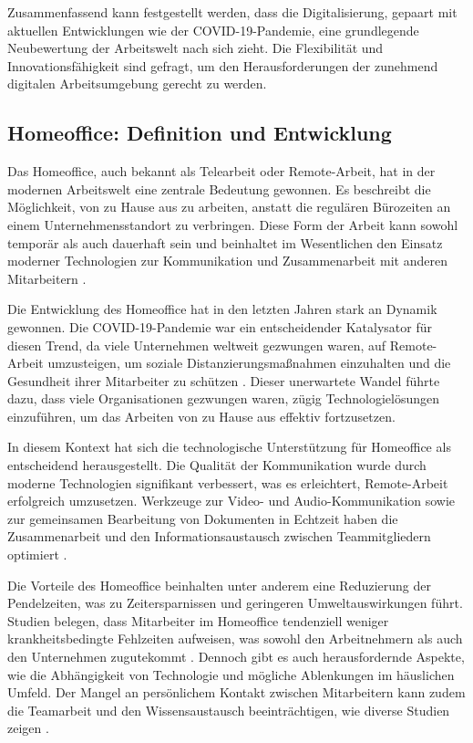 Zusammenfassend kann festgestellt werden, dass die Digitalisierung, gepaart mit aktuellen Entwicklungen wie der COVID-19-Pandemie, eine grundlegende Neubewertung der Arbeitswelt nach sich zieht. Die Flexibilität und Innovationsfähigkeit sind gefragt, um den Herausforderungen der zunehmend digitalen Arbeitsumgebung gerecht zu werden.

\subsection{Homeoffice: Definition und Entwicklung}

Das Homeoffice, auch bekannt als Telearbeit oder Remote-Arbeit, hat in der modernen Arbeitswelt eine zentrale Bedeutung gewonnen. Es beschreibt die Möglichkeit, von zu Hause aus zu arbeiten, anstatt die regulären Bürozeiten an einem Unternehmensstandort zu verbringen. Diese Form der Arbeit kann sowohl temporär als auch dauerhaft sein und beinhaltet im Wesentlichen den Einsatz moderner Technologien zur Kommunikation und Zusammenarbeit mit anderen Mitarbeitern \cite{7}.

Die Entwicklung des Homeoffice hat in den letzten Jahren stark an Dynamik gewonnen. Die COVID-19-Pandemie war ein entscheidender Katalysator für diesen Trend, da viele Unternehmen weltweit gezwungen waren, auf Remote-Arbeit umzusteigen, um soziale Distanzierungsmaßnahmen einzuhalten und die Gesundheit ihrer Mitarbeiter zu schützen \cite{file1}. Dieser unerwartete Wandel führte dazu, dass viele Organisationen gezwungen waren, zügig Technologielösungen einzuführen, um das Arbeiten von zu Hause aus effektiv fortzusetzen.

In diesem Kontext hat sich die technologische Unterstützung für Homeoffice als entscheidend herausgestellt. Die Qualität der Kommunikation wurde durch moderne Technologien signifikant verbessert, was es erleichtert, Remote-Arbeit erfolgreich umzusetzen. Werkzeuge zur Video- und Audio-Kommunikation sowie zur gemeinsamen Bearbeitung von Dokumenten in Echtzeit haben die Zusammenarbeit und den Informationsaustausch zwischen Teammitgliedern optimiert \cite{7}.

Die Vorteile des Homeoffice beinhalten unter anderem eine Reduzierung der Pendelzeiten, was zu Zeitersparnissen und geringeren Umweltauswirkungen führt. Studien belegen, dass Mitarbeiter im Homeoffice tendenziell weniger krankheitsbedingte Fehlzeiten aufweisen, was sowohl den Arbeitnehmern als auch den Unternehmen zugutekommt \cite{file1}. Dennoch gibt es auch herausfordernde Aspekte, wie die Abhängigkeit von Technologie und mögliche Ablenkungen im häuslichen Umfeld. Der Mangel an persönlichem Kontakt zwischen Mitarbeitern kann zudem die Teamarbeit und den Wissensaustausch beeinträchtigen, wie diverse Studien zeigen \cite{file1}.

